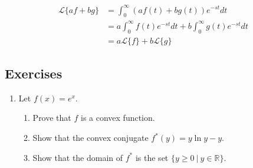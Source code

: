 \documentclass[book.tex]{subfiles}
\begin{document}
\begin{align}
    \mathcal{L}\{af + bg\} &= \int_{0}^{\infty} (a f(t) + b g(t)) e^{-st} dt \\
    &= a\int_{0}^{\infty} f(t)e^{-st} dt + b \int_{0}^{\infty} g(t) e^{-st} dt \\
    &= a\mathcal{L}\{f\} + b \mathcal{L}\{g\}
\end{align}


\subsection{Exercises}
\begin{enumerate}
    \item Let $f(x) = e^x$.
    \begin{enumerate}
        \item Prove that $f$ is a convex function. 
        \item Show that the convex conjugate $f^*(y) = y \ln y - y$. 
        \item Show that the domain of $f^*$ is the set $\{y \geq 0\ |\ y \in \mathbb{R}\}$.
    \end{enumerate}
\end{enumerate}
\end{document}
